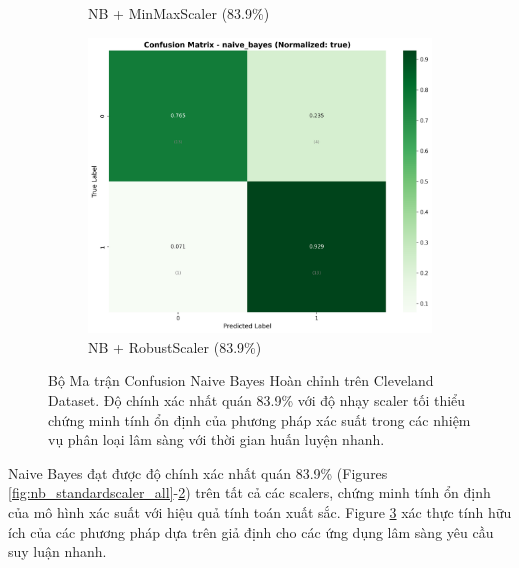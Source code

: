 \begin{figure}[H]
\begin{subfigure}[b]{0.315\textwidth}
\caption{NB + MinMaxScaler (83.9\%)}
\label{fig:nb_minmaxscaler_all}
\end{subfigure}
\hfill
\begin{subfigure}[b]{0.315\textwidth}
\centering
\includegraphics[width=1\textwidth]{Result/cleveland_dataset/confusion_matrices/naive_bayes_numeric_dataset_RobustScaler.png}
\caption{NB + RobustScaler (83.9\%)}
\label{fig:nb_robustscaler_all}
\end{subfigure}

\caption{Bộ Ma trận Confusion Naive Bayes Hoàn chỉnh trên Cleveland Dataset. Độ chính xác nhất quán 83.9\% với độ nhạy scaler tối thiểu chứng minh tính ổn định của phương pháp xác suất trong các nhiệm vụ phân loại lâm sàng với thời gian huấn luyện nhanh.}
\label{fig:nb_all_scalers_complete_analysis}
\end{figure}

Naive Bayes đạt được độ chính xác nhất quán 83.9\% (Figures \ref{fig:nb_standardscaler_all}-\ref{fig:nb_robustscaler_all}) trên tất cả các scalers, chứng minh tính ổn định của mô hình xác suất với hiệu quả tính toán xuất sắc. Figure \ref{fig:nb_all_scalers_complete_analysis} xác thực tính hữu ích của các phương pháp dựa trên giả định cho các ứng dụng lâm sàng yêu cầu suy luận nhanh.

